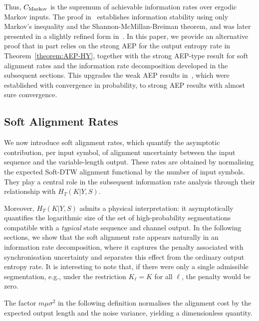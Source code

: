 \documentclass[onecolumn]{IEEEtran}
\theoremstyle{definition}
\begin{document}
Thus, \(C_{\rm Markov}\) is the supremum of achievable information rates over ergodic Markov inputs. The proof in~\cite{McBain2024b} establishes information stability using only Markov's inequality and the Shannon-McMillan-Breiman theorem, and was later presented in a slightly refined form in~\cite{McBain2025a}. In this paper, we provide an alternative proof that in part relies on the strong AEP for the output entropy rate in Theorem~\ref{theorem:AEP-HY}, together with the strong AEP-type result for soft alignment rates and the information rate decomposition developed in the subsequent sections. This upgrades the weak AEP results in~\cite{McBain2024b}, which were established with convergence in probability, to strong AEP results with almost sure convergence. %


\subsection{Soft Alignment Rates}

We now introduce soft alignment rates, which quantify the asymptotic
contribution, per input symbol, of alignment uncertainty between the input
sequence and the variable-length output. These rates are obtained by normalising the expected Soft-DTW alignment functional by the number of input symbols. They play a central role in the subsequent information rate analysis through their
relationship with $H_T(K|Y,S)$.

Moreover, $H_T(K|Y,S)$ admits a physical interpretation: it asymptotically
quantifies the logarithmic size of the set of high-probability segmentations compatible with a {\em typical} state sequence and channel output. In the
following sections, we show that the soft alignment rate appears naturally in an information rate decomposition, where it captures the penalty associated with synchronisation uncertainty and separates this effect from the ordinary
output entropy rate. It is interesting to note that, if there were only a single admissible segmentation, e.g., under the restriction $K_{\ell}=K$ for all $\ell$, the penalty would be zero.

{
The factor $m\mu\sigma^2$ in the following definition normalises the alignment cost by the expected output length and the noise variance, yielding a dimensionless quantity.
}
\end{document}

